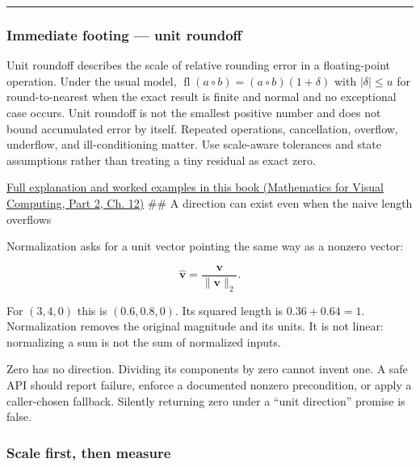 \begin{center}\rule{0.5\linewidth}{0.5pt}\end{center}

\subsubsection{Immediate footing --- unit roundoff}\label{01-foundations-i-ch017-immediate-footing-unit-roundoff}

\hypertarget{01-foundations-i-ch017-immediate-footing-unit-roundoff}{}

Unit roundoff describes the scale of relative rounding error in a floating-point operation. Under the usual model, \(\operatorname{fl}(a\circ b)=(a\circ b)(1+\delta)\) with \(|\delta|\le u\) for round-to-nearest when the exact result is finite and normal and no exceptional case occurs. Unit roundoff is not the smallest positive number and does not bound accumulated error by itself. Repeated operations, cancellation, overflow, underflow, and ill-conditioning matter. Use scale-aware tolerances and state assumptions rather than treating a tiny residual as exact zero.

\href{../02-Mathematics-for-Visual-Computing-P02/main.pdf\#nameddest=02-foundations-ii-ch028-floating-point-answers-error-conditioning-stability-and-stable-arithmetic}{Full explanation and worked examples in this book (Mathematics for Visual Computing, Part 2, Ch. 12)} \#\# A direction can exist even when the naive length overflows

{Normalization} asks for a unit vector pointing the same way as a nonzero vector:

\[
\widehat{\mathbf v}=\frac{\mathbf v}{\|\mathbf v\|_2}.
\]

For \((3,4,0)\) this is \((0.6,0.8,0)\). Its squared length is \(0.36+0.64=1\). Normalization removes the original magnitude and its units. It is not linear: normalizing a sum is not the sum of normalized inputs.

Zero has no direction. Dividing its components by zero cannot invent one. A safe API should report failure, enforce a documented nonzero precondition, or apply a caller-chosen fallback. Silently returning zero under a ``unit direction'' promise is false.

\subsubsection{Scale first, then measure}\label{01-foundations-i-ch017-scale-first-then-measure}

